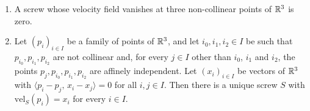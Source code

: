 \begin{lemma}
  \label{lem:screw-determination}
  \leanok
  \begin{enumerate}
    \item A screw whose velocity field vanishes at three non-collinear
      points of ${\mathbb{R}}^3$ is zero.
    \item Let $(p_i)_{i \in I}$ be a family of points of ${\mathbb{R}}^3$, and let
      $i_0, i_1, i_2 \in I$ be such that $p_{i_0}, p_{i_1}, p_{i_2}$ are
      not collinear and, for every $j \in I$ other than $i_0$, $i_1$
      and $i_2$, the points $p_j, p_{i_0}, p_{i_1}, p_{i_2}$ are
      affinely independent. Let $(x_i)_{i \in I}$ be vectors of ${\mathbb{R}}^3$
      with $\langle p_i - p_j,\, x_i - x_j \rangle = 0$ for all
      $i, j \in I$. Then there is a unique screw $S$ with
      $\mathrm{vel}_S(p_i) = x_i$ for every $i \in I$.
  \end{enumerate}
\end{lemma}
